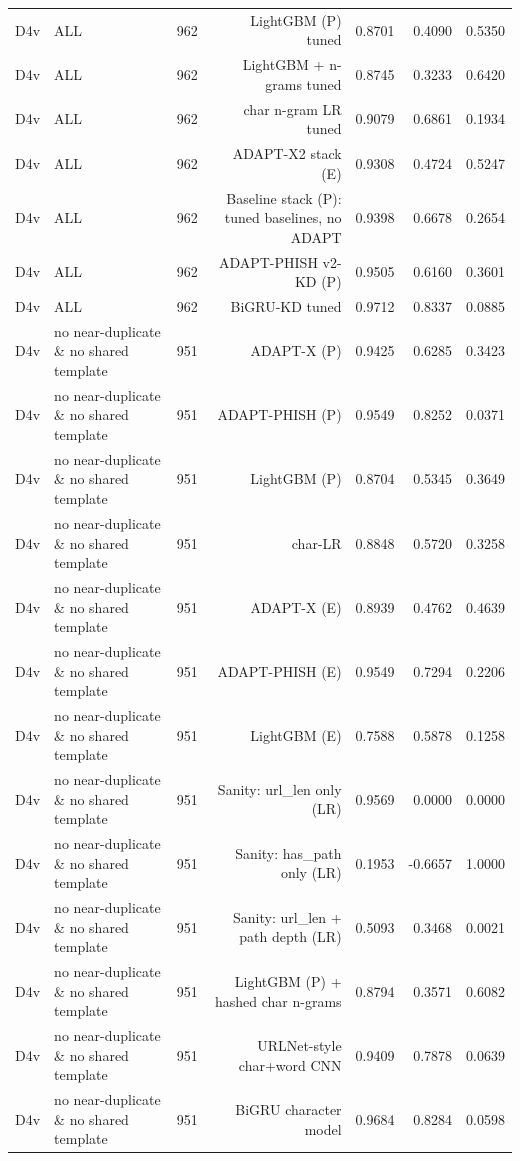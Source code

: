 \begin{table}[t]
\begin{tabular}{llrrrrr}
D4v & ALL & 962 & LightGBM (P) tuned & 0.8701 & 0.4090 & 0.5350 \\
D4v & ALL & 962 & LightGBM + n-grams tuned & 0.8745 & 0.3233 & 0.6420 \\
D4v & ALL & 962 & char n-gram LR tuned & 0.9079 & 0.6861 & 0.1934 \\
D4v & ALL & 962 & ADAPT-X2 stack (E) & 0.9308 & 0.4724 & 0.5247 \\
D4v & ALL & 962 & Baseline stack (P): tuned baselines, no ADAPT & 0.9398 & 0.6678 & 0.2654 \\
D4v & ALL & 962 & ADAPT-PHISH v2-KD (P) & 0.9505 & 0.6160 & 0.3601 \\
D4v & ALL & 962 & BiGRU-KD tuned & 0.9712 & 0.8337 & 0.0885 \\
D4v & no near-duplicate \& no shared template & 951 & ADAPT-X (P) & 0.9425 & 0.6285 & 0.3423 \\
D4v & no near-duplicate \& no shared template & 951 & ADAPT-PHISH (P) & 0.9549 & 0.8252 & 0.0371 \\
D4v & no near-duplicate \& no shared template & 951 & LightGBM (P) & 0.8704 & 0.5345 & 0.3649 \\
D4v & no near-duplicate \& no shared template & 951 & char-LR & 0.8848 & 0.5720 & 0.3258 \\
D4v & no near-duplicate \& no shared template & 951 & ADAPT-X (E) & 0.8939 & 0.4762 & 0.4639 \\
D4v & no near-duplicate \& no shared template & 951 & ADAPT-PHISH (E) & 0.9549 & 0.7294 & 0.2206 \\
D4v & no near-duplicate \& no shared template & 951 & LightGBM (E) & 0.7588 & 0.5878 & 0.1258 \\
D4v & no near-duplicate \& no shared template & 951 & Sanity: url\_len only (LR) & 0.9569 & 0.0000 & 0.0000 \\
D4v & no near-duplicate \& no shared template & 951 & Sanity: has\_path only (LR) & 0.1953 & -0.6657 & 1.0000 \\
D4v & no near-duplicate \& no shared template & 951 & Sanity: url\_len + path depth (LR) & 0.5093 & 0.3468 & 0.0021 \\
D4v & no near-duplicate \& no shared template & 951 & LightGBM (P) + hashed char n-grams & 0.8794 & 0.3571 & 0.6082 \\
D4v & no near-duplicate \& no shared template & 951 & URLNet-style char+word CNN & 0.9409 & 0.7878 & 0.0639 \\
D4v & no near-duplicate \& no shared template & 951 & BiGRU character model & 0.9684 & 0.8284 & 0.0598 \\

\end{tabular}
\end{table}
